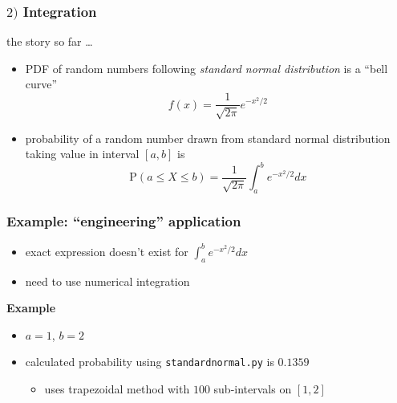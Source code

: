 \documentclass[english,14pt]{beamer}
\newcommand\red[1]{{\color{red} #1}}
\begin{document}

\begin{frame}[fragile]

\frametitle{$2)$ Integration}

the story so far \ldots

\begin{itemize}
	\item PDF of random numbers following \red{\emph{standard normal distribution}} is a ``bell curve''
\[
	f(x) = \frac{1}{\sqrt{2\pi}} e^{-x^2/2}
\]
	\item probability of a random number drawn from standard normal distribution taking value in interval $[a,b]$ is
	\[
	\mathrm{P}(a \leq X \leq b) = \frac{1}{\sqrt{2\pi}} \int_a^b  e^{-x^2/2} dx
	\]

\end{itemize}

\end{frame}


\begin{frame}[fragile]

\frametitle{Example: ``engineering'' application}

\begin{itemize}
	\item exact expression doesn't exist for $\int_a^b e^{-x^2/2} dx$
	\item need to use numerical integration
\end{itemize}

\textbf{Example}

\begin{itemize}
	\item $a = 1$, $b = 2$
	\item calculated probability using \texttt{standardnormal.py} is $0.1359$
	\begin{itemize}
		\item uses trapezoidal method with $100$ sub-intervals on $[1,2]$
	\end{itemize}
\end{itemize}

\end{frame}

\end{document}
